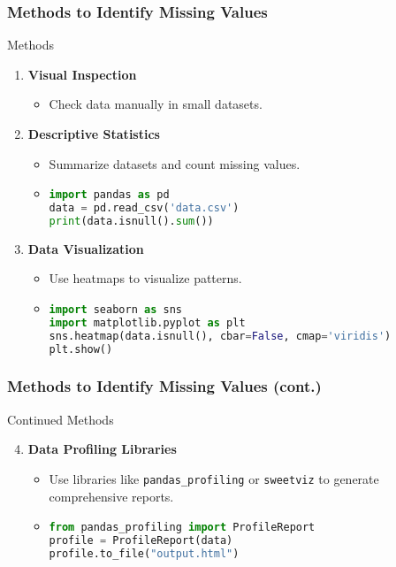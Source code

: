 \documentclass[aspectratio=169]{beamer}
\begin{document}
\begin{frame}[fragile]
  \frametitle{Methods to Identify Missing Values}
  \begin{block}{Methods}
    \begin{enumerate}
      \item \textbf{Visual Inspection}
        \begin{itemize}
          \item Check data manually in small datasets.
        \end{itemize}
      \item \textbf{Descriptive Statistics}
        \begin{itemize}
          \item Summarize datasets and count missing values.
          \item \begin{lstlisting}[language=Python]
import pandas as pd
data = pd.read_csv('data.csv')
print(data.isnull().sum())
          \end{lstlisting}
        \end{itemize}
      \item \textbf{Data Visualization}
        \begin{itemize}
          \item Use heatmaps to visualize patterns.
          \item \begin{lstlisting}[language=Python]
import seaborn as sns
import matplotlib.pyplot as plt
sns.heatmap(data.isnull(), cbar=False, cmap='viridis')
plt.show()
          \end{lstlisting}
        \end{itemize}
    \end{enumerate}
  \end{block}
\end{frame}

\begin{frame}[fragile]
  \frametitle{Methods to Identify Missing Values (cont.)}
  \begin{block}{Continued Methods}
    \begin{enumerate}
      \setcounter{enumi}{3}  %
      \item \textbf{Data Profiling Libraries}
        \begin{itemize}
          \item Use libraries like \texttt{pandas\_profiling} or \texttt{sweetviz} to generate comprehensive reports.
          \item \begin{lstlisting}[language=Python]
from pandas_profiling import ProfileReport
profile = ProfileReport(data)
profile.to_file("output.html")
          \end{lstlisting}
        \end{itemize}
    \end{enumerate}
  \end{block}
\end{frame}
\end{document}
